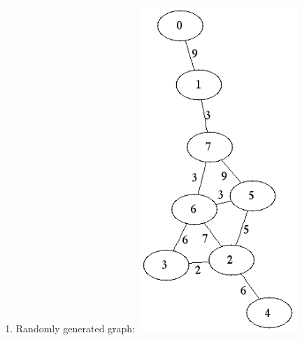 \documentclass[12pt]{chmullighw}
\begin{document}
\begin{enumerate}
\item Randomly generated graph:
\includegraphics[width=6cm]{q6.png}

\end{enumerate} %
\end{document}
